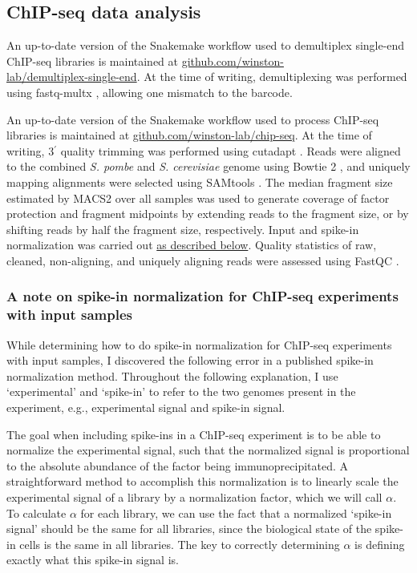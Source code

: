 \subsection{ChIP-seq data analysis}

An up-to-date version of the Snakemake \citep{koster2012} workflow used to demultiplex single-end ChIP-seq libraries is maintained at \href{https://github.com/winston-lab/demultiplex-single-end}{github.com/winston-\\lab/demultiplex-single-end}.
At the time of writing, demultiplexing was performed using fastq-multx \citep{aronesty2013}, allowing one mismatch to the barcode.

An up-to-date version of the Snakemake \citep{koster2012} workflow used to process ChIP-seq libraries is maintained at \href{https://github.com/winston-lab/chip-seq}{github.com/winston-lab/chip-seq}.
At the time of writing, 3$^\prime$ quality trimming was performed using cutadapt \citep{martin2011}.
Reads were aligned to the combined \textit{S. pombe} and \textit{S. cerevisiae} genome using Bowtie 2 \citep{langmead2012}, and uniquely mapping alignments were selected using SAMtools \citep{li2009}.
The median fragment size estimated by MACS2 \citep{zhang2008} over all samples was used to generate coverage of factor protection and fragment midpoints by extending reads to the fragment size, or by shifting reads by half the fragment size, respectively.
Input and spike-in normalization was carried out \hyperref[subsubsec:chip_spikein]{as described below}.
Quality statistics of raw, cleaned, non-aligning, and uniquely aligning reads were assessed using FastQC \citep{andrews2010}.

\subsubsection{A note on spike-in normalization for ChIP-seq experiments with input samples}
\label{subsubsec:chip_spikein}

While determining how to do spike-in normalization for ChIP-seq experiments with input samples, I discovered the following error in a published spike-in normalization method.
Throughout the following explanation, I use `experimental' and `spike-in' to refer to the two genomes present in the experiment, e.g., experimental signal and spike-in signal.

The goal when including spike-ins in a ChIP-seq experiment is to be able to normalize the experimental signal, such that the normalized signal is proportional to the absolute abundance of the factor being immunoprecipitated.
A straightforward method to accomplish this normalization is to linearly scale the experimental signal of a library by a normalization factor, which we will call $\alpha$.
To calculate $\alpha$ for each library, we can use the fact that a normalized `spike-in signal' should be the same for all libraries, since the biological state of the spike-in cells is the same in all libraries.
The key to correctly determining $\alpha$ is defining exactly what this spike-in signal is.

